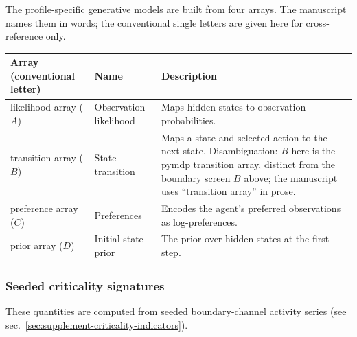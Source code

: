 \documentclass[
]{article}
\newcounter{none} %
\begin{document}
The profile-specific generative models are built from four arrays. The
manuscript names them in words; the conventional single letters are
given here for cross-reference only.

{\def\LTcaptype{none} %
\begin{longtable}[]{@{}
  >{\raggedright\arraybackslash}p{}
  >{\raggedright\arraybackslash}p{}
  >{\raggedright\arraybackslash}p{}@{}}
\toprule\noalign{}
\begin{minipage}[b]{\linewidth}\raggedright
Array (conventional letter)
\end{minipage} & \begin{minipage}[b]{\linewidth}\raggedright
Name
\end{minipage} & \begin{minipage}[b]{\linewidth}\raggedright
Description
\end{minipage} \\
\midrule\noalign{}
\endhead
\bottomrule\noalign{}
\endlastfoot
likelihood array (\(A\)) & Observation likelihood & Maps hidden states
to observation probabilities. \\
transition array (\(B\)) & State transition & Maps a state and selected
action to the next state. Disambiguation: \(B\) here is the pymdp
transition array, distinct from the boundary screen \(B\) above; the
manuscript uses ``transition array'' in prose. \\
preference array (\(C\)) & Preferences & Encodes the agent's preferred
observations as log-preferences. \\
prior array (\(D\)) & Initial-state prior & The prior over hidden states
at the first step. \\
\end{longtable}
}

\subsubsection{Seeded criticality
signatures}\label{seeded-criticality-signatures}

These quantities are computed from seeded boundary-channel activity
series (see sec.~\ref{sec:supplement-criticality-indicators}).
\end{document}
